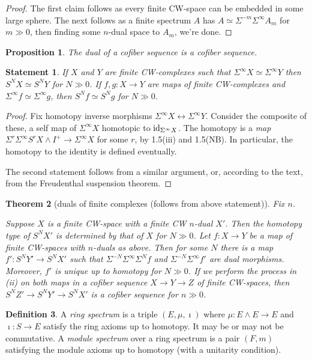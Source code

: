 \documentclass[11pt]{article}
\theoremstyle{plain}
\newtheorem{thm}{Theorem}[subsection]
\newtheorem{prop}[thm]{Proposition}
\newtheorem*{statement*}{Statement}
\theoremstyle{definition}
\newtheorem{defn}[thm]{Definition}
\begin{document}
\begin{proof}
The first claim follows as every finite CW-space can be embedded in some large
sphere. The next follows as a finite spectrum $A$ has $A\simeq
\Sigma^{-m}\Sigma^\infty A_m$ for $m\gg0$, then finding some $n$-dual space to
$A_m$, we're done.
\end{proof}
\begin{prop}
The dual of a cofiber sequence is a cofiber sequence.
\end{prop}
\begin{statement*}
If $X$ and $Y$ are finite CW-complexes such that 
$\Sigma^\infty X\simeq\Sigma^\infty Y$ then $S^NX\simeq S^NY$ for $N\gg0$.
If $f,g:X\to Y$ are maps of finite CW-complexes and $\Sigma^\infty
f\simeq\Sigma^\infty g$, then $S^Nf\simeq S^Ng$ for $N\gg0$.
\end{statement*}
\begin{proof}
Fix homotopy inverse morphisms $\Sigma^\infty X\longleftrightarrow\Sigma^\infty
Y$. Consider the composite of these, a self map of $\Sigma^\infty X$ homotopic
to $\textup{id}_{\Sigma^{\infty}X}$. The homotopy is a \emph{map}
$\Sigma^r\Sigma^{\infty}S^rX\wedge I^+\to\Sigma^\infty X$ for some $r$, by
1.5(iii) and 1.5(NB). In particular, the homotopy to the identity is defined
eventually.

The second statement follows from a similar argument, or, according to the text,
from the Freudenthal suspension theorem.
\end{proof}
\begin{thm}[duals of finite complexes {\small(follows from above statement)}]
Fix $n$.
\begin{itemise}
\itm[(i)]Suppose $X$ is a finite CW-space with a finite CW $n$-dual $X'$. Then
the homotopy type of $S^NX'$ is determined by that of $X$ for $N\gg0$.
\itm[(ii)] Let $f:X\to Y$ be a map of finite CW-spaces with $n$-duals as above.
Then for some $N$ there is a map $f':S^NY'\to S^NX'$ such that
$\Sigma^{-N}\Sigma^\infty \Sigma^Nf$ and $\Sigma^{-N}\Sigma^\infty f'$ are dual
morphisms. Moreover, $f'$ is unique up to homotopy for $N\gg0$.
\itm[(iii)]If we perform the process in (ii) on both maps in a cofiber sequence
$X\to Y\to Z$ of finite CW-spaces, then $S^NZ'\to S^NY'\to S^NX'$ is a cofiber
sequence for $n\gg0$.
\end{itemise}
\end{thm}
\begin{defn}
A \emph{ring spectrum} is a triple $(E,\mu,\imath)$ where $\mu:E\wedge E\to E$
and $\imath:S\to E$ satisfy the ring axioms up to homotopy. It may be or may not
be commutative. A \emph{module spectrum} over a ring spectrum is a pair $(F,m)$
satisfying the module axioms up to homotopy (with a unitarity condition).
\end{defn}
\end{document}
